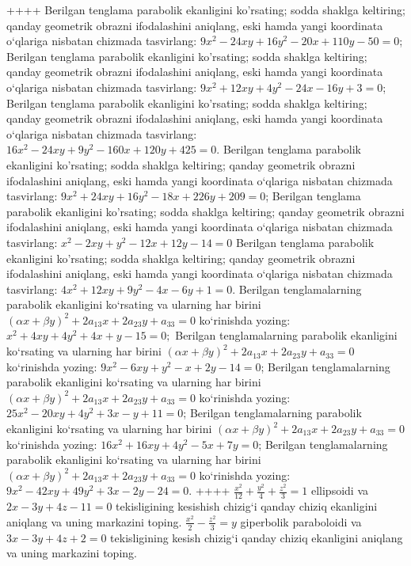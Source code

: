 ++++
Berilgan tenglama parabolik ekanligini ko'rsating; sodda shaklga keltiring; qanday geometrik obrazni ifodalashini aniqlang, eski hamda yangi koordinata o‘qlariga nisbatan chizmada tasvirlang: $9 x^2-24 x y+16 y^2-20 x+110 y-50=0$;
Berilgan tenglama parabolik ekanligini ko'rsating; sodda shaklga keltiring; qanday geometrik obrazni ifodalashini aniqlang, eski hamda yangi koordinata o‘qlariga nisbatan chizmada tasvirlang: $9 x^2+12 x y+4 y^2-24 x-16 y+3=0$;
Berilgan tenglama parabolik ekanligini ko'rsating; sodda shaklga keltiring; qanday geometrik obrazni ifodalashini aniqlang, eski hamda yangi koordinata o‘qlariga nisbatan chizmada tasvirlang: $16 x^2-24 x y+9 y^2-160 x+120 y+425=0$.
Berilgan tenglama parabolik ekanligini ko'rsating; sodda shaklga keltiring; qanday geometrik obrazni ifodalashini aniqlang, eski hamda yangi koordinata o‘qlariga nisbatan chizmada tasvirlang: $9 x^2+24 x y+16 y^2-18 x+226 y+209=0$;
Berilgan tenglama parabolik ekanligini ko'rsating; sodda shaklga keltiring; qanday geometrik obrazni ifodalashini aniqlang, eski hamda yangi koordinata o‘qlariga nisbatan chizmada tasvirlang: $x^2-2 x y+y^2-12 x+12 y-14=0$
Berilgan tenglama parabolik ekanligini ko'rsating; sodda shaklga keltiring; qanday geometrik obrazni ifodalashini aniqlang, eski hamda yangi koordinata o‘qlariga nisbatan chizmada tasvirlang: $4 x^2+12 x y+9 y^2-4 x-6 y+1=0$.
Berilgan tenglamalarning parabolik ekanligini ko‘rsating va ularning har birini $(\alpha x+\beta y)^2+2 a_{13} x+2 a_{23} y+a_{33}=0$ ko‘rinishda yozing: $x^2+4 x y+4 y^2+4 x+y-15=0 ;$
Berilgan tenglamalarning parabolik ekanligini ko‘rsating va ularning har birini $(\alpha x+\beta y)^2+2 a_{13} x+2 a_{23} y+a_{33}=0$ ko‘rinishda yozing: $9 x^2-6 x y+y^2-x+2 y-14=0$;
Berilgan tenglamalarning parabolik ekanligini ko‘rsating va ularning har birini $(\alpha x+\beta y)^2+2 a_{13} x+2 a_{23} y+a_{33}=0$ ko‘rinishda yozing: $25 x^2-20 x y+4 y^2+3 x-y+11=0$;
Berilgan tenglamalarning parabolik ekanligini ko‘rsating va ularning har birini $(\alpha x+\beta y)^2+2 a_{13} x+2 a_{23} y+a_{33}=0$ ko‘rinishda yozing: $16 x^2+16 x y+4 y^2-5 x+7 y=0$;
Berilgan tenglamalarning parabolik ekanligini ko‘rsating va ularning har birini $(\alpha x+\beta y)^2+2 a_{13} x+2 a_{23} y+a_{33}=0$ ko‘rinishda yozing: $9 x^2-42 x y+49 y^2+3 x-2 y-24=0$.
++++
$\frac{x^2}{12}+\frac{y^2}{4}+\frac{z^2}{3}=1$ ellipsoidi va $2x-3y+4z-11=0$ tekisligining kesishish chizig‘i qanday chiziq ekanligini aniqlang va uning markazini toping.
$\frac{x^2}{2}-\frac{z^2}{3}=y$ giperbolik paraboloidi va $3x-3y+4z+2=0$ tekisligining kesish chizig‘i qanday chiziq ekanligini aniqlang va uning markazini toping.
